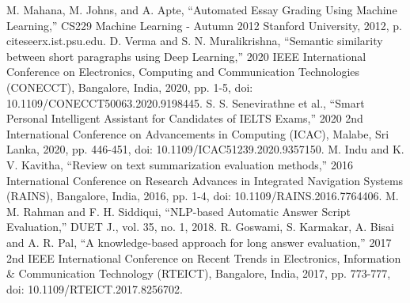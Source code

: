 \documentclass[conference]{IEEEtran}
\begin{document}
\begin{thebibliography}{00}
 M. Mahana, M. Johns, and A. Apte, ``Automated Essay Grading Using Machine Learning,'' CS229 Machine Learning - Autumn 2012 Stanford University, 2012, p. citeseerx.ist.psu.edu.
 D. Verma and S. N. Muralikrishna, ``Semantic similarity between short paragraphs using Deep Learning,'' 2020 IEEE International Conference on Electronics, Computing and Communication Technologies (CONECCT), Bangalore, India, 2020, pp. 1-5, doi: 10.1109/CONECCT50063.2020.9198445.
 S. S. Senevirathne et al., ``Smart Personal Intelligent Assistant for Candidates of IELTS Exams,'' 2020 2nd International Conference on Advancements in Computing (ICAC), Malabe, Sri Lanka, 2020, pp. 446-451, doi: 10.1109/ICAC51239.2020.9357150.
 M. Indu and K. V. Kavitha, ``Review on text summarization evaluation methods,'' 2016 International Conference on Research Advances in Integrated Navigation Systems (RAINS), Bangalore, India, 2016, pp. 1-4, doi: 10.1109/RAINS.2016.7764406.
 M. M. Rahman and F. H. Siddiqui, ``NLP-based Automatic Answer Script Evaluation,'' DUET J., vol. 35, no. 1, 2018.
 R. Goswami, S. Karmakar, A. Bisai and A. R. Pal, ``A knowledge-based approach for long answer evaluation,'' 2017 2nd IEEE International Conference on Recent Trends in Electronics, Information \& Communication Technology (RTEICT), Bangalore, India, 2017, pp. 773-777, doi: 10.1109/RTEICT.2017.8256702.

\end{thebibliography}
\end{document}
